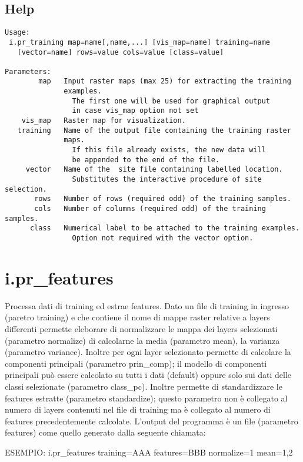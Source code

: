 \subsection*{Help}
\begin{verbatim}
Usage:
 i.pr_training map=name[,name,...] [vis_map=name] training=name
   [vector=name] rows=value cols=value [class=value]

Parameters:
        map   Input raster maps (max 25) for extracting the training
              examples.
                The first one will be used for graphical output 
                in case vis_map option not set
    vis_map   Raster map for visualization.
   training   Name of the output file containing the training raster 
              maps.
                If this file already exists, the new data will 
                be appended to the end of the file.
     vector   Name of the  site file containing labelled location.
                Substitutes the interactive procedure of site selection.
       rows   Number of rows (required odd) of the training samples.
       cols   Number of columns (required odd) of the training samples.
      class   Numerical label to be attached to the training examples.
                Option not required with the vector option.
\end{verbatim}

\section{i.pr\_features}
Processa dati di training ed estrae features. Dato un file di training
in ingresso (paretro training) e che contiene il nome di mappe raster
relative a layers differenti permette eleborare di normalizzare le
mappa dei layers selezionati (parametro normalize) di calcolarne la
media (parametro mean), la varianza (parametro variance). Inoltre per
ogni layer selezionato permette di calcolare la componenti principali
(parametro prin\_comp); il modello di componenti principali pu\`{o}
essere calcolato su tutti i dati (default) oppure solo sui dati delle
classi selezionate (parametro class\_pc). Inoltre permette di
standardizzare le features estratte (parametro standardize); questo
parametro non \`{e} collegato al numero di layers contenuti nel file di
training ma \`{e} collegato al numero di features precedentemente
calcolate. L'output del programma \`{e} un file (parametro features) come quello generato dalla seguente chiamata:

ESEMPIO: i.pr\_features training=AAA features=BBB normalize=1 mean=1,2

